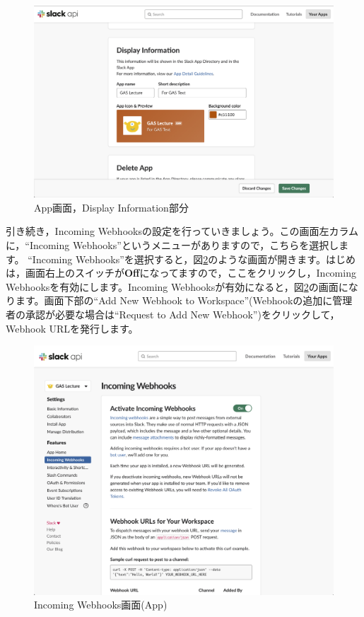 \documentclass[uplatex,a4j]{jsarticle}
\begin{document}
\begin{figure}[H]
 \centering
 \includegraphics[keepaspectratio, scale=0.5]{images/create_new_app5.png}
 \caption{App画面，Display Information部分}
 \label{fig:create_new_app5}
\end{figure}

引き続き，Incoming Webhooksの設定を行っていきましょう。この画面左カラムに，``Incoming Webhooks''というメニューがありますので，こちらを選択します。
``Incoming Webhooks''を選択すると，図\ref{fig:create_new_app4}のような画面が開きます。はじめは，画面右上のスイッチが\textbf{Off}になってますので，ここをクリックし，Incoming Webhooksを有効にします。Incoming Webhooksが有効になると，図\ref{fig:create_new_app4}の画面になります。画面下部の``Add New Webhook to Workspace''(Webhookの追加に管理者の承認が必要な場合は``Request to Add New Webhook'')をクリックして，Webhook URLを発行します。

\begin{figure}[H]
 \centering
 \includegraphics[keepaspectratio, scale=0.6]{images/create_new_app4.png}
 \caption{Incoming Webhooks画面(App)}
 \label{fig:create_new_app4}
\end{figure}
\end{document}
